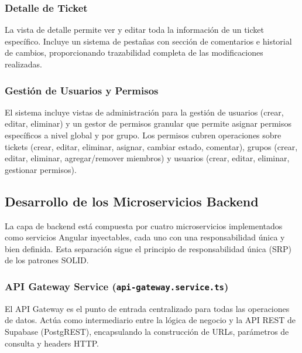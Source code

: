 \documentclass[12pt,a4paper]{article}
\begin{document}
\subsubsection{Detalle de Ticket}

La vista de detalle permite ver y editar toda la información de un ticket específico. Incluye un sistema de pestañas con sección de comentarios e historial de cambios, proporcionando trazabilidad completa de las modificaciones realizadas.


\subsubsection{Gestión de Usuarios y Permisos}

El sistema incluye vistas de administración para la gestión de usuarios (crear, editar, eliminar) y un gestor de permisos granular que permite asignar permisos específicos a nivel global y por grupo. Los permisos cubren operaciones sobre tickets (crear, editar, eliminar, asignar, cambiar estado, comentar), grupos (crear, editar, eliminar, agregar/remover miembros) y usuarios (crear, editar, eliminar, gestionar permisos).

\subsection{Desarrollo de los Microservicios Backend}

La capa de backend está compuesta por cuatro microservicios implementados como servicios Angular inyectables, cada uno con una responsabilidad única y bien definida. Esta separación sigue el principio de responsabilidad única (SRP) de los patrones SOLID.

\subsubsection{API Gateway Service (\texttt{api-gateway.service.ts})}

El API Gateway es el punto de entrada centralizado para todas las operaciones de datos. Actúa como intermediario entre la lógica de negocio y la API REST de Supabase (PostgREST), encapsulando la construcción de URLs, parámetros de consulta y headers HTTP.
\end{document}
